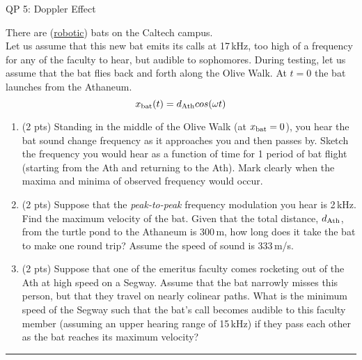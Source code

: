 \documentclass[12pt]{article}
\begin{document}
%
\begin{centering}
\LARGE{QP 5: Doppler Effect}
\end{centering}
\bigskip
\bigskip

There are
(\href{http://www.caltech.edu/news/engineers-build-robot-drone-mimics-bat-flight-53794}{robotic})
bats on the Caltech campus. \\

Let us assume that this new bat emits its calls at 17\,kHz, too high of a frequency for any of the faculty
to hear, but audible to sophomores. During testing, let us assume that the bat
flies back and forth along the Olive Walk. At $t = 0$ the bat launches from the Athaneum.
\begin{equation}
x_{\rm bat}(t) = d_{\rm Ath} cos(\omega t)
\end{equation}

\begin{enumerate}[label=(\alph*)]
\item (2 pts)
Standing in the middle of the Olive Walk (at $x_{\rm bat} = 0$),
you hear the bat sound change frequency as it approaches you and then passes by.
Sketch the frequency you would hear as a function of time for 1 period of bat flight (starting from the Ath and returning to the Ath). Mark clearly when the maxima and minima of observed frequency would occur.

\item (2 pts)
Suppose that the \emph{peak-to-peak} frequency modulation you hear is 2\,kHz. Find the
maximum velocity of the bat.  Given that the total distance, $d_{\rm Ath}$, from the turtle pond to the Athaneum
is 300\,m, how long does it take the bat to make one round trip? Assume the speed of sound is 333\,m/s.

\item (2 pts)
Suppose that one of the emeritus faculty comes rocketing out of the Ath at high speed on a Segway.
Assume that the bat narrowly misses this person, but that they travel on nearly colinear paths. What is the minimum speed of the Segway such that the bat's call becomes audible to this faculty member (assuming an upper hearing range of 15\,kHz) if they pass each other as the bat reaches its maximum velocity?

\end{enumerate}
\bigskip
{\color{Sepia} \hrule}



\end{document}

